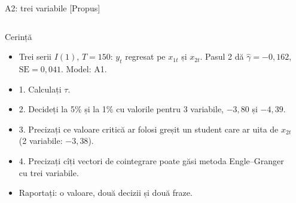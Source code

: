\begin{frame}{A2: trei variabile [Propus]}
\propsub
\itemsize{\scriptsize}
\begin{columns}[T]
\begin{column}{\taskw}
\begin{block}{Cerință}
\begin{itemize}
    \item Trei serii $I(1)$, $T = 150$: $y_t$ regresat pe $x_{1t}$ și $x_{2t}$. Pasul 2 dă $\hat\gamma = -0{,}162$, $\mathrm{SE} = 0{,}041$. Model: A1.
    \item 1. Calculați $\tau$.
    \item 2. Decideți la 5\% și la 1\% cu valorile pentru 3 variabile, $-3{,}80$ și $-4{,}39$.
    \item 3. Precizați ce valoare critică ar folosi greșit un student care ar uita de $x_{2t}$ (2 variabile: $-3{,}38$).
    \item 4. Precizați cîți vectori de cointegrare poate găsi metoda Engle--Granger cu trei variabile.
    \item Raportați: o valoare, două decizii și două fraze.
\end{itemize}
\end{block}
\end{column}
\begin{column}{\solw}
\end{column}
\end{columns}
\end{frame}

